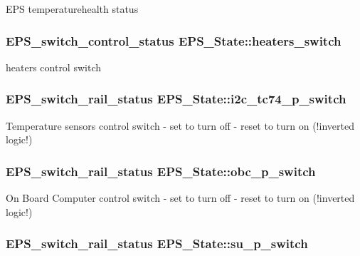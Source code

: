 E\-P\-S temperaturehealth status \hypertarget{struct_e_p_s___state_a6b22df97afb9a109a08b31cb317daa12}{
\subsubsection[{heaters\-\_\-switch}]{\setlength{\rightskip}{0pt plus 5cm}E\-P\-S\-\_\-switch\-\_\-control\-\_\-status E\-P\-S\-\_\-\-State\-::heaters\-\_\-switch}}\label{struct_e_p_s___state_a6b22df97afb9a109a08b31cb317daa12}
heaters control switch \hypertarget{struct_e_p_s___state_ae6b0752b3fb97c08ed1ee44a0991e261}{
\subsubsection[{i2c\-\_\-tc74\-\_\-p\-\_\-switch}]{\setlength{\rightskip}{0pt plus 5cm}E\-P\-S\-\_\-switch\-\_\-rail\-\_\-status E\-P\-S\-\_\-\-State\-::i2c\-\_\-tc74\-\_\-p\-\_\-switch}}\label{struct_e_p_s___state_ae6b0752b3fb97c08ed1ee44a0991e261}
Temperature sensors control switch -\/ set to turn off -\/ reset to turn on (!inverted logic!) \hypertarget{struct_e_p_s___state_aa8b56582a0983130d495482a5b0a4bde}{
\subsubsection[{obc\-\_\-p\-\_\-switch}]{\setlength{\rightskip}{0pt plus 5cm}E\-P\-S\-\_\-switch\-\_\-rail\-\_\-status E\-P\-S\-\_\-\-State\-::obc\-\_\-p\-\_\-switch}}\label{struct_e_p_s___state_aa8b56582a0983130d495482a5b0a4bde}
On Board Computer control switch -\/ set to turn off -\/ reset to turn on (!inverted logic!) \hypertarget{struct_e_p_s___state_a242773a5b843bcb1f4c4620a4c84d7c2}{
\subsubsection[{su\-\_\-p\-\_\-switch}]{\setlength{\rightskip}{0pt plus 5cm}E\-P\-S\-\_\-switch\-\_\-rail\-\_\-status E\-P\-S\-\_\-\-State\-::su\-\_\-p\-\_\-switch}}\label{struct_e_p_s___state_a242773a5b843bcb1f4c4620a4c84d7c2}
